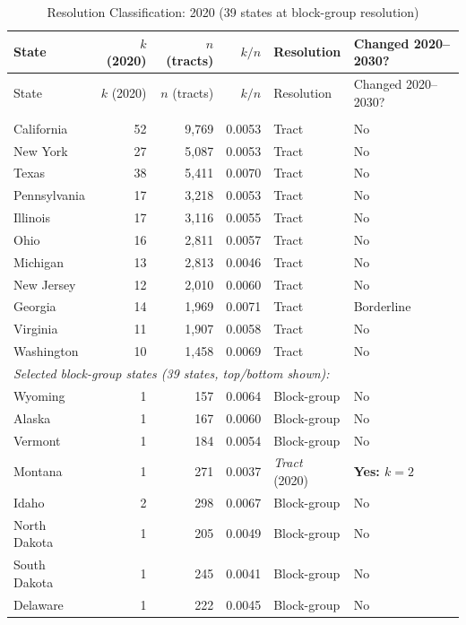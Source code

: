 \begin{longtable}{lrrrll}
\caption{Resolution Classification: 2020 (39 states at block-group resolution)} \\
\toprule
State & $k$ (2020) & $n$ (tracts) & $k/n$ & Resolution & Changed 2020--2030? \\
\midrule
\endfirsthead
\toprule
State & $k$ (2020) & $n$ (tracts) & $k/n$ & Resolution & Changed 2020--2030? \\
\midrule
\endhead
\bottomrule
\endfoot
\multicolumn{6}{l}{\textit{States at tract resolution (11 states):}} \\
California & 52 & 9,769 & 0.0053 & Tract & No \\
New York & 27 & 5,087 & 0.0053 & Tract & No \\
Texas & 38 & 5,411 & 0.0070 & Tract & No \\
Pennsylvania & 17 & 3,218 & 0.0053 & Tract & No \\
Illinois & 17 & 3,116 & 0.0055 & Tract & No \\
Ohio & 16 & 2,811 & 0.0057 & Tract & No \\
Michigan & 13 & 2,813 & 0.0046 & Tract & No \\
New Jersey & 12 & 2,010 & 0.0060 & Tract & No \\
Georgia & 14 & 1,969 & 0.0071 & Tract & Borderline \\
Virginia & 11 & 1,907 & 0.0058 & Tract & No \\
Washington & 10 & 1,458 & 0.0069 & Tract & No \\
\multicolumn{6}{l}{\textit{Selected block-group states (39 states, top/bottom shown):}} \\
Wyoming & 1 & 157 & 0.0064 & Block-group & No \\
Alaska & 1 & 167 & 0.0060 & Block-group & No \\
Vermont & 1 & 184 & 0.0054 & Block-group & No \\
Montana & 1 & 271 & 0.0037 & \textit{Tract} (2020) & \textbf{Yes: $k=2$} \\
Idaho & 2 & 298 & 0.0067 & Block-group & No \\
North Dakota & 1 & 205 & 0.0049 & Block-group & No \\
South Dakota & 1 & 245 & 0.0041 & Block-group & No \\
Delaware & 1 & 222 & 0.0045 & Block-group & No \\
\end{longtable}

